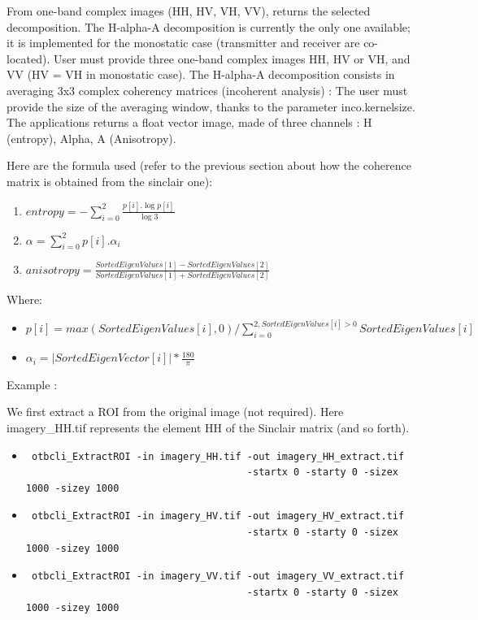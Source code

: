 From one-band complex images (HH, HV, VH, VV), returns the selected decomposition.
The H-alpha-A decomposition is currently the only one available; it is implemented for the monostatic case (transmitter and receiver are co-located).
User must provide three one-band complex images HH, HV or VH, and VV (HV = VH in monostatic case).
The H-alpha-A decomposition consists in averaging 3x3 complex coherency matrices (incoherent analysis) : 
The user must provide the size of the averaging window, thanks to the parameter inco.kernelsize.
The applications returns a float vector image, made of three channels : H (entropy), Alpha, A (Anisotropy).

Here are the formula used (refer to the previous section about how the coherence matrix is obtained from the sinclair one):
\begin{enumerate}
\renewcommand{\labelenumii}{Channel \arabic{enumii} : }
\item $ entropy = -\sum_{i=0}^{2} \frac{p[i].\log{p[i]}}{\log{3}} $
\item $ \alpha = \sum_{i=0}^{2} p[i].\alpha_{i} $
\item $ anisotropy = \frac {SortedEigenValues[1] - SortedEigenValues[2]}{SortedEigenValues[1] + SortedEigenValues[2]} $
\end{enumerate}

Where:
\begin{itemize}
\item $ p[i] = max(SortedEigenValues[i], 0) / \sum_{i=0}^{2, SortedEigenValues[i]>0} SortedEigenValues[i] $
\item $ \alpha_{i} = \left| SortedEigenVector[i] \right|* \frac{180}{\pi}$
\end{itemize}


Example :

We first extract a ROI from the original image (not required). 
Here imagery\_HH.tif represents the element HH of the Sinclair matrix (and so forth).

\begin{itemize}
\item \begin{verbatim} otbcli_ExtractROI -in imagery_HH.tif -out imagery_HH_extract.tif  
									  -startx 0 -starty 0 -sizex 1000 -sizey 1000 \end{verbatim}
									  
\item \begin{verbatim} otbcli_ExtractROI -in imagery_HV.tif -out imagery_HV_extract.tif  
									  -startx 0 -starty 0 -sizex 1000 -sizey 1000 \end{verbatim}
									  
\item \begin{verbatim} otbcli_ExtractROI -in imagery_VV.tif -out imagery_VV_extract.tif  
									  -startx 0 -starty 0 -sizex 1000 -sizey 1000 \end{verbatim}
\end{itemize}

